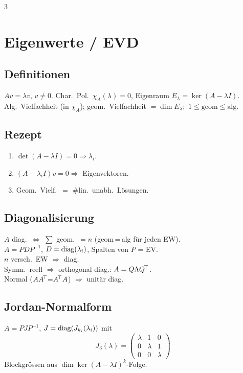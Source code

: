 \documentclass[8pt,a4paper]{extarticle}
\begin{document}
\begin{multicols*}{3}
\section{Eigenwerte / EVD}
\subsection{Definitionen}
$Av=\lambda v$, $v\ne 0$. Char.\ Pol.\ $\chi_A(\lambda){=}0$, Eigenraum $E_\lambda{=}\ker(A-\lambda I)$.\\
Alg.\ Vielfachheit (in $\chi_A$); geom.\ Vielfachheit $=\dim E_\lambda$;\ $1\!\le\!\text{geom}\!\le\!\text{alg}$.

\subsection{Rezept}
\begin{enumerate}
\item $\det(A-\lambda I){=}0 \Rightarrow \lambda_i$.
\item $(A-\lambda_i I)v=0 \Rightarrow$ Eigenvektoren.
\item Geom.\ Vielf.\ $=$ \#lin.\ unabh.\ L\"osungen.
\end{enumerate}

\subsection{Diagonalisierung}
$A$ diag.\ $\Leftrightarrow$ $\sum$ geom.\ $=n$ (geom\,=\,alg f\"ur jeden EW).\\
$A=PDP^{-1}$, $D=\operatorname{diag}(\lambda_i)$, Spalten von $P$ = EV.\\
$n$ versch.\ EW $\Rightarrow$ diag.\ \\
Symm.\ reell $\Rightarrow$ orthogonal diag.: $A=Q\Lambda Q^{\!\top}$.\\
Normal ($AA^{\!\top}{=}A^{\!\top} A$) $\Rightarrow$ unit\"ar diag.\\

\subsection{Jordan-Normalform}
$A=PJP^{-1}$, $J=\operatorname{diag}(J_{k_i}(\lambda_i))$ mit
\[ J_3(\lambda)=\begin{pmatrix}\lambda&1&0\\0&\lambda&1\\0&0&\lambda\end{pmatrix} \]
Blockgr\"ossen aus $\dim\ker(A-\lambda I)^k$-Folge.


\end{multicols*}
\end{document}
